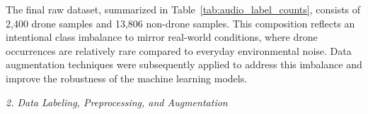 \documentclass[12pt]{article}
\begin{document}
{The final raw dataset, summarized in Table~\ref{tab:audio_label_counts}, consists of 2,400 drone samples and 13,806 non-drone samples. This composition reflects an intentional class imbalance to mirror real-world conditions, where drone occurrences are relatively rare compared to everyday environmental noise. Data augmentation techniques were subsequently applied to address this imbalance and improve the robustness of the machine learning models.

}

\begin{center}
{\fontsize{9}{11}\selectfont\textit{2. Data Labeling, Preprocessing, and Augmentation}}
\end{center}

\vspace{0.2em}
\end{document}

